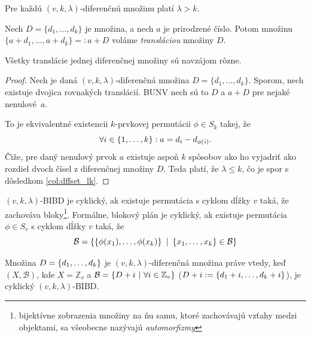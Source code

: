 \begin{corollary}
\label{col:dffset_lk}
Pre každú $(v,k,\lambda)$-diferenčnú množinu platí $\lambda > k$.
\end{corollary}

\begin{definition}
Nech $D = \{d_1, \ldots, d_k\}$ je množina, a nech $a$ je prirodzené číslo. Potom množinu $\{a + d_1, \ldots, a + d_k\} =: a + D$ voláme \emph{transláciou} množiny $D$.
\end{definition}

\begin{lemma}
Všetky translácie jednej diferenčnej množiny sú navzájom rôzne. 
\end{lemma}
\begin{proof}
Nech je daná $(v,k,\lambda)$-diferenčná množina $D = \{d_1, \ldots, d_k\}$.
Sporom, nech existuje dvojica rovnakých translácií. 
BUNV nech sú to $D$ a $a + D$ pre nejaké nenulové~$a$.

To je ekvivalentné existencii $k$-prvkovej permutácii $\phi \in S_k$ takej, že $$\forall i \in \left\{1, \ldots, k\right\}: a = d_i - d_{\phi(i)}.$$
Čiže, pre daný nenulový prvok $a$ existuje aspoň $k$ spôsobov ako ho vyjadriť ako rozdiel dvoch čísel z diferenčnej množiny $D$. Teda platí, že $\lambda \leq k$, čo je spor s dôsledkom \ref{col:dffset_lk}.
\end{proof}

\begin{definition}
\label{def:cyclic_bibd}
$(v, k, \lambda)$-BIBD je cyklický, ak existuje permutácia s cyklom dĺžky $v$ taká, že zachováva bloky\footnote{
bijektívne zobrazenia množiny na ňu samu, ktoré zachovávajú vzťahy medzi objektami, sa všeobecne nazývajú \emph{automorfizmy}}. 
Formálne, blokový plán je cyklický, ak 
existuje permutácia  $\phi \in S_v$ s cyklom dĺžky $v$ taká, že 
$$\mathcal{B} = \left\{\left\{\phi(x_1), \ldots, \phi(x_k)\right\} ~|~ \left\{x_1, \ldots, x_k\right\} \in \mathcal{B} \right\}$$
\end{definition}

\begin{theorem}
\label{th:ds_bibd}
Množina $D = \left\{d_1, \ldots, d_k\right\}$ je $(v, k, \lambda)$-diferenčná množina práve vtedy, keď $(X, \mathcal{B})$, kde $X = \mathbb{Z}_v$ a $\mathcal{B} = \left\{D + i ~|~ \forall i \in \mathbb{Z}_v\right\}$ ($D + i := \left\{d_1 + i, \ldots, d_k + i\right\}$), je cyklický $(v, k, \lambda)$-BIBD. 
\end{theorem}


